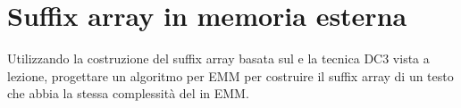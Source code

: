 \chapter{Suffix array in memoria esterna}

\begin{problem*}
    Utilizzando la costruzione del suffix array basata sul \mergesort e la tecnica
    DC3 vista a lezione, progettare un algoritmo per EMM per costruire il suffix
    array di un testo che abbia la stessa complessit\`a del \mergesort in EMM.
\end{problem*}

